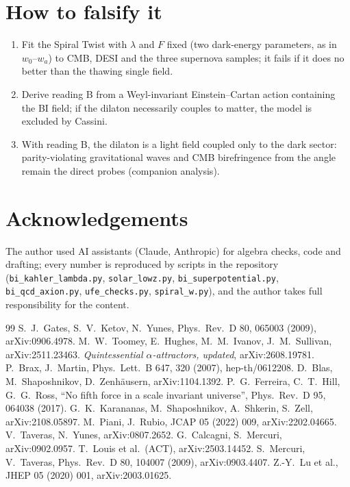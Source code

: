 \documentclass[11pt]{article}
\begin{document}
\section{How to falsify it}
\begin{enumerate}
\item Fit the Spiral Twist with $\lambda$ and $F$ fixed (two dark-energy parameters, as in $w_0$--$w_a$) to CMB, DESI
and the three supernova samples; it fails if it does no better than the thawing single field.
\item Derive reading B from a Weyl-invariant Einstein--Cartan action containing the BI field; if the dilaton
necessarily couples to matter, the model is excluded by Cassini.
\item With reading B, the dilaton is a light field coupled only to the dark sector: parity-violating gravitational
waves and CMB birefringence from the angle remain the direct probes (companion analysis).
\end{enumerate}

\section*{Acknowledgements}
The author used AI assistants (Claude, Anthropic) for algebra checks, code and drafting; every number is reproduced
by scripts in the repository (\texttt{bi\_kahler\_lambda.py}, \texttt{solar\_lowz.py},
\texttt{bi\_superpotential.py}, \texttt{bi\_qcd\_axion.py}, \texttt{ufe\_checks.py}, \texttt{spiral\_w.py}), and the
author takes full responsibility for the content.

\begin{thebibliography}{99}\small
{} S.~J.~Gates, S.~V.~Ketov, N.~Yunes, Phys.\ Rev.\ D 80, 065003 (2009), arXiv:0906.4978.
 M.~W.~Toomey, E.~Hughes, M.~M.~Ivanov, J.~M.~Sullivan, arXiv:2511.23463.
 \emph{Quintessential $\alpha$-attractors, updated}, arXiv:2608.19781.
 P.~Brax, J.~Martin, Phys.\ Lett.\ B 647, 320 (2007), hep-th/0612208.
 D.~Blas, M.~Shaposhnikov, D.~Zenh\"ausern, arXiv:1104.1392.
 P.~G.~Ferreira, C.~T.~Hill, G.~G.~Ross, ``No fifth force in a scale invariant universe'',
Phys.\ Rev.\ D 95, 064038 (2017).
 G.~K.~Karananas, M.~Shaposhnikov, A.~Shkerin, S.~Zell, arXiv:2108.05897.
 M.~Piani, J.~Rubio, JCAP 05 (2022) 009, arXiv:2202.04665.
 V.~Taveras, N.~Yunes, arXiv:0807.2652.
 G.~Calcagni, S.~Mercuri, arXiv:0902.0957.
 T.~Louis et al.\ (ACT), arXiv:2503.14452.
 S.~Mercuri, V.~Taveras, Phys.\ Rev.\ D 80, 104007 (2009), arXiv:0903.4407.
 Z.-Y.~Lu et al., JHEP 05 (2020) 001, arXiv:2003.01625.
\end{thebibliography}
\end{document}
